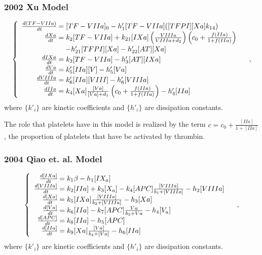 \begin{frame}
\frametitle{2002 Xu Model}\vspace{-1.5em}
$$\begin{cases}\begin{array}{rl}
\frac{d(TF-VIIa)}{dt}\hspace{-.8em}&=[TF-VIIa]_0-h'_1[TF-VIIa]([TFPI][Xa]k_{14})\\
\frac{dXa}{dt}\hspace{-.8em}&=k_2[TF-VIIa]+k_{21}[IXa]\left(\frac{VIIIa}{VIIIa+d_2}\right)\left(c_0+\frac{f(IIa)}{1+f(IIa)}\right)\\&\hspace{1em}-h'_{21}[TFPI][Xa]-h'_{22}[AT][Xa]\\
\frac{dIXa}{dt}\hspace{-.8em}&=k_3[TF-VIIa]-h'_3[AT][IXa]\\
\frac{dVa}{dt}\hspace{-.8em}&=k'_5[IIa][V]-h'_5[Va]\\
\frac{dVIIIa}{dt}\hspace{-.8em}&=k'_6[IIa][VIII]-h'_6[VIIIa]\\
\frac{dIIa}{dt}\hspace{-.8em}&=k_4[Xa]\frac{[Va]}{[Va]+d_1}\left(c_0+\frac{f(IIa)}{1+f(IIa)}\right)-h'_4[IIa]
\end{array}\end{cases},$$ where $\{k'_i\}$ are kinetic coefficients and $\{h'_i\}$ are dissipation constants.

\hspace{1.57em}The role that platelets have in this model is realized by the term $c=c_0+\frac{[IIa]}{1+[IIa]}$, the proportion of platelets that have be activated by thrombin.%
\end{frame}

\begin{frame}
\frametitle{2004 Qiao et. al. Model}\vspace{-1.5em}
$$\begin{cases}\begin{array}{rl}
\frac{d[IXa]}{dt}\hspace{-.8em}&=k_1\beta-h_1[IX_a]\\
\frac{d[VIIIa]}{dt}\hspace{-.8em}&=k_2[IIa]+k_3[X_a]-k_4[APC]\frac{[VIIIa]}{b_1+[VIIIa]}-h_2[VIIIa]\\
\frac{d[Xa]}{dt}\hspace{-.8em}&=k_5[IXa]\frac{[VIIIa]}{b_2+[VIIIa]}-h_3[Xa]\\
\frac{d[Va]}{dt}\hspace{-.8em}&=k_6[IIa]-k_7[APC]\frac{Va}{b_3+Va}-h_4[V_a]\\
\frac{d[APC]}{dt}\hspace{-.8em}&=k_8[IIa]-h_5[APC]\\
\frac{d[IIa]}{dt}\hspace{-.8em}&=k_9[Xa]\frac{[Va]}{b_4+[Va]}-h_6[IIa]
\end{array}\end{cases},$$ where $\{k'_i\}$ are kinetic coefficients and $\{h'_i\}$ are dissipation constants.
\end{frame}

